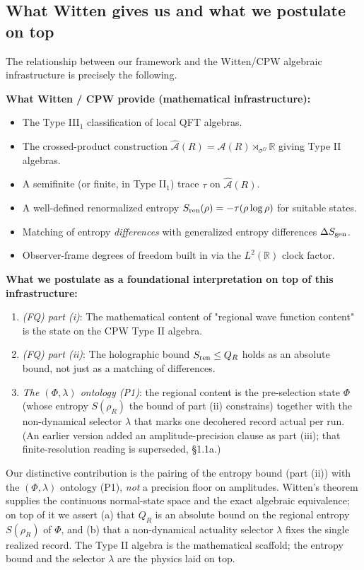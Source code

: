 \documentclass[11pt,a4paper]{article}
\begin{document}
\subsection{What Witten gives us and what we postulate on top}

The relationship between our framework and the Witten/CPW algebraic infrastructure is precisely the following.

\textbf{What Witten / CPW provide (mathematical infrastructure):}
\begin{itemize}
  \item The Type III$_1$ classification of local QFT algebras.
  \item The crossed-product construction $\hat{\mathcal{A}}(R) = \mathcal{A}(R) \rtimes_{\sigma^\Omega} \mathbb{R}$ giving Type II algebras.
  \item A semifinite (or finite, in Type II$_1$) trace $\tau$ on $\hat{\mathcal{A}}(R)$.
  \item A well-defined renormalized entropy $S_{\rm ren}(\rho) = -\tau(\rho \log \rho)$ for suitable states.
  \item Matching of entropy \emph{differences} with generalized entropy differences $\Delta S_{\rm gen}$.
  \item Observer-frame degrees of freedom built in via the $L^2(\mathbb{R})$ clock factor.
\end{itemize}

\textbf{What we postulate as a foundational interpretation on top of this infrastructure:}
\begin{enumerate}
  \item \emph{(FQ) part (i)}: The mathematical content of "regional wave function content" is the state on the CPW Type II algebra.
  \item \emph{(FQ) part (ii)}: The holographic bound $S_{\rm ren} \le Q_R$ holds as an absolute bound, not just as a matching of differences.
  \item \emph{The $(\Phi,\lambda)$ ontology (P1)}: the regional content is the pre-selection state $\Phi$ (whose entropy $S(\rho_R)$ the bound of part (ii) constrains) together with the non-dynamical selector $\lambda$ that marks one decohered record actual per run. (An earlier version added an amplitude-precision clause as part (iii); that finite-resolution reading is superseded, §1.1a.)
\end{enumerate}

Our distinctive contribution is the pairing of the entropy bound (part (ii)) with the $(\Phi,\lambda)$ ontology (P1), \emph{not} a precision floor on amplitudes. Witten's theorem supplies the continuous normal-state space and the exact algebraic equivalence; on top of it we assert (a) that $Q_R$ is an absolute bound on the regional entropy $S(\rho_R)$ of $\Phi$, and (b) that a non-dynamical actuality selector $\lambda$ fixes the single realized record. The Type II algebra is the mathematical scaffold; the entropy bound and the selector $\lambda$ are the physics laid on top.
\end{document}
